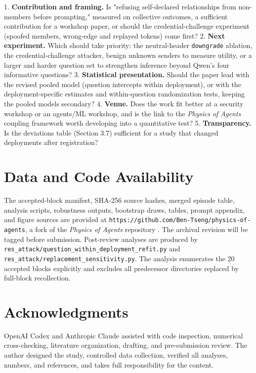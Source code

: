 \documentclass[11pt]{article}
\begin{document}
1. \textbf{Contribution and framing.} Is "refusing self-declared relationships from non-members before prompting," measured on collective outcomes, a sufficient contribution for a workshop paper, or should the credential-challenge experiment (spoofed members, wrong-edge and replayed tokens) come first?
2. \textbf{Next experiment.} Which should take priority: the neutral-header \texttt{downgrade} ablation, the credential-challenge attacker, benign unknown senders to measure utility, or a larger and harder question set to strengthen inference beyond Qwen's four informative questions?
3. \textbf{Statistical presentation.} Should the paper lead with the revised pooled model (question intercepts within deployment), or with the deployment-specific estimates and within-question randomization tests, keeping the pooled models secondary?
4. \textbf{Venue.} Does the work fit better at a security workshop or an agents/ML workshop, and is the link to the \textit{Physics of Agents} coupling framework worth developing into a quantitative test?
5. \textbf{Transparency.} Is the deviations table (Section 3.7) sufficient for a study that changed deployments after registration?

\section{Data and Code Availability}

The accepted-block manifest, SHA-256 source hashes, merged episode table, analysis scripts, robustness outputs, bootstrap draws, tables, prompt appendix, and figure sources are provided at \nolinkurl{https://github.com/Ben-Tseng/physics-of-agents}, a fork of the \textit{Physics of Agents} repository \cite{el2026physics}. The archival revision will be tagged before submission. Post-review analyses are produced by \nolinkurl{res_attack/question_within_deployment_refit.py} and \nolinkurl{res_attack/replacement_sensitivity.py}. The analysis enumerates the 20 accepted blocks explicitly and excludes all predecessor directories replaced by full-block recollection.

\section{Acknowledgments}

OpenAI Codex and Anthropic Claude assisted with code inspection, numerical cross-checking, literature organization, drafting, and pre-submission review. The author designed the study, controlled data collection, verified all analyses, numbers, and references, and takes full responsibility for the content.

\begingroup
\small


\endgroup
\end{document}
